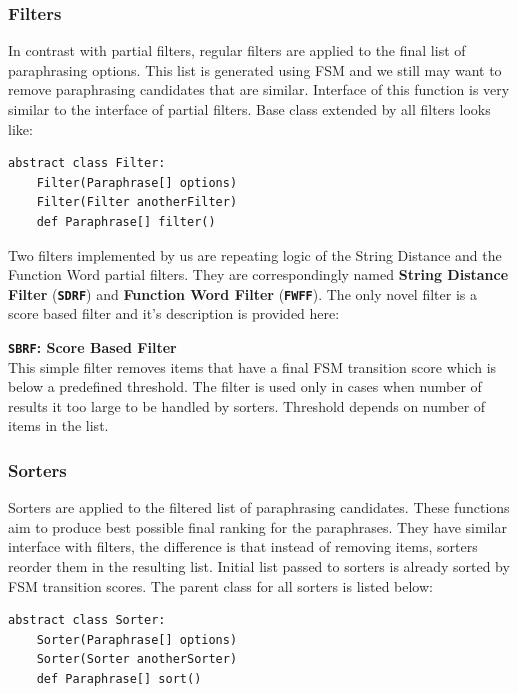 \subsubsection{Filters}

In contrast with partial filters, regular filters are applied to the final list of paraphrasing options. This list is generated using FSM and we still may want to remove paraphrasing candidates that are similar. Interface of this function is very similar to the interface of partial filters. Base class extended by all filters looks like:

\begin{verbatim}
abstract class Filter:
    Filter(Paraphrase[] options)
    Filter(Filter anotherFilter)
    def Paraphrase[] filter()
\end{verbatim}

Two filters implemented by us are repeating logic of the String Distance and the Function Word partial filters. They are correspondingly named \textbf{String Distance Filter} (\textbf{\texttt{SDRF}}) and \textbf{Function Word Filter} (\texttt{\textbf{FWFF}}). The only novel filter is a score based filter and it's description is provided here:


\begin{flushleft}

\textbf{\texttt{SBRF}: \textbf{Score Based Filter}} \\
This simple filter removes items that have a final FSM transition score which is below a predefined threshold. 
The filter is used only in cases when number of results it too large to be handled by sorters. Threshold depends on number of items in the list.
\bigskip

\end{flushleft}

\subsubsection{Sorters}

Sorters are applied to the filtered list of paraphrasing candidates. These functions aim to produce best possible final ranking for the paraphrases. They have similar interface with filters, the difference is that instead of removing items, sorters reorder them in the resulting list. Initial list passed to sorters is already sorted by FSM transition scores. The parent class for all sorters is listed below:

\begin{verbatim}
abstract class Sorter:
    Sorter(Paraphrase[] options)
    Sorter(Sorter anotherSorter)
    def Paraphrase[] sort()
\end{verbatim}


